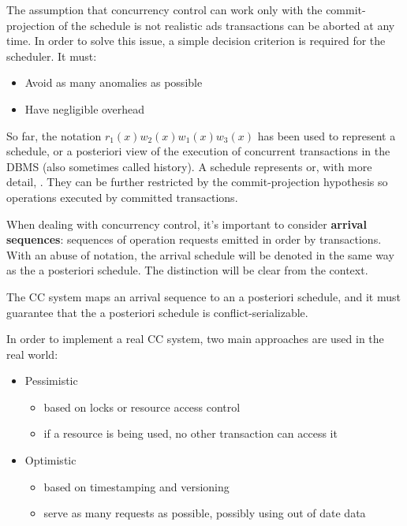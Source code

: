 \documentclass[english]{article}
\begin{document}
The assumption that concurrency control can work only with the commit-projection of the schedule is not realistic ads transactions can be aborted at any time.
In order to solve this issue, a simple decision criterion is required for the scheduler.
It must:

\begin{itemize}
  \item Avoid as many anomalies as possible
  \item Have negligible overhead
\end{itemize}

\bigskip

So far, the notation \(r_1(x) w_2(x) w_1(x) w_3(x)\) has been used to represent a schedule, or a posteriori view of the execution of concurrent transactions in the DBMS (also sometimes called history).
A schedule represents  or, with more detail, .
They can be further restricted by the commit-projection hypothesis so operations executed by committed transactions.

When dealing with concurrency control, it's important to consider \textbf{arrival sequences}: sequences of operation requests emitted in order by transactions.
With an abuse of notation, the arrival schedule will be denoted in the same way as the a posteriori schedule.
The distinction will be clear from the context.

The CC system maps an arrival sequence to an a posteriori schedule, and it must guarantee that the a posteriori schedule is conflict-serializable.

\bigskip

In order to implement a real CC system, two main approaches are used in the real world:

\begin{itemize}
  \item Pessimistic
        \begin{itemize}
          \item based on locks or resource access control
          \item if a resource is being used, no other transaction can access it
        \end{itemize}
  \item Optimistic
        \begin{itemize}
          \item based on timestamping and versioning
          \item serve as many requests as possible, possibly using out of date data
        \end{itemize}
\end{itemize}
\end{document}
